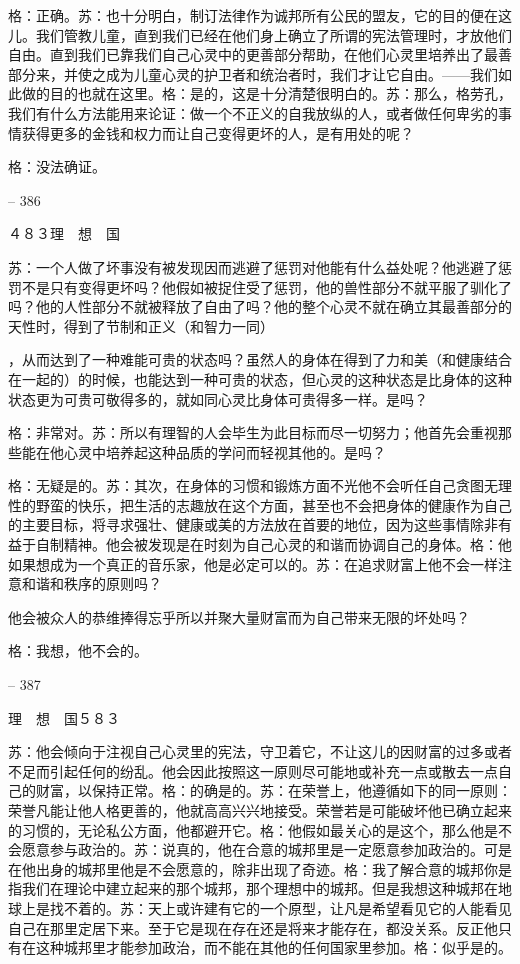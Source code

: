 \documentclass[11pt,oneside]{book}
\begin{document}
\begin{common-format}
    格：正确。苏：也十分明白，制订法律作为诚邦所有公民的盟友，它的目的便在这儿。我们管教儿童，直到我们已经在他们身上确立了所谓的宪法管理时，才放他们自由。直到我们已靠我们自己心灵中的更善部分帮助，在他们心灵里培养出了最善部分来，并使之成为儿童心灵的护卫者和统治者时，我们才让它自由。——我们如此做的目的也就在这里。格：是的，这是十分清楚很明白的。苏：那么，格劳孔，我们有什么方法能用来论证：做一个不正义的自我放纵的人，或者做任何卑劣的事情获得更多的金钱和权力而让自己变得更坏的人，是有用处的呢？

    格：没法确证。

    

-- 386

    ４８３理　想　国

    苏：一个人做了坏事没有被发现因而逃避了惩罚对他能有什么益处呢？他逃避了惩罚不是只有变得更坏吗？他假如被捉住受了惩罚，他的兽性部分不就平服了驯化了吗？他的人性部分不就被释放了自由了吗？他的整个心灵不就在确立其最善部分的天性时，得到了节制和正义（和智力一同）

    ，从而达到了一种难能可贵的状态吗？虽然人的身体在得到了力和美（和健康结合在一起的）的时候，也能达到一种可贵的状态，但心灵的这种状态是比身体的这种状态更为可贵可敬得多的，就如同心灵比身体可贵得多一样。是吗？

    格：非常对。苏：所以有理智的人会毕生为此目标而尽一切努力；他首先会重视那些能在他心灵中培养起这种品质的学问而轻视其他的。是吗？

    格：无疑是的。苏：其次，在身体的习惯和锻炼方面不光他不会听任自己贪图无理性的野蛮的快乐，把生活的志趣放在这个方面，甚至也不会把身体的健康作为自己的主要目标，将寻求强壮、健康或美的方法放在首要的地位，因为这些事情除非有益于自制精神。他会被发现是在时刻为自己心灵的和谐而协调自己的身体。格：他如果想成为一个真正的音乐家，他是必定可以的。苏：在追求财富上他不会一样注意和谐和秩序的原则吗？

    他会被众人的恭维捧得忘乎所以并聚大量财富而为自己带来无限的坏处吗？

    格：我想，他不会的。

    

-- 387

    理　想　国５８３

    苏：他会倾向于注视自己心灵里的宪法，守卫着它，不让这儿的因财富的过多或者不足而引起任何的纷乱。他会因此按照这一原则尽可能地或补充一点或散去一点自己的财富，以保持正常。格：的确是的。苏：在荣誉上，他遵循如下的同一原则：荣誉凡能让他人格更善的，他就高高兴兴地接受。荣誉若是可能破坏他已确立起来的习惯的，无论私公方面，他都避开它。格：他假如最关心的是这个，那么他是不会愿意参与政治的。苏：说真的，他在合意的城邦里是一定愿意参加政治的。可是在他出身的城邦里他是不会愿意的，除非出现了奇迹。格：我了解合意的城邦你是指我们在理论中建立起来的那个城邦，那个理想中的城邦。但是我想这种城邦在地球上是找不着的。苏：天上或许建有它的一个原型，让凡是希望看见它的人能看见自己在那里定居下来。至于它是现在存在还是将来才能存在，都没关系。反正他只有在这种城邦里才能参加政治，而不能在其他的任何国家里参加。格：似乎是的。


\end{common-format}
\end{document}
